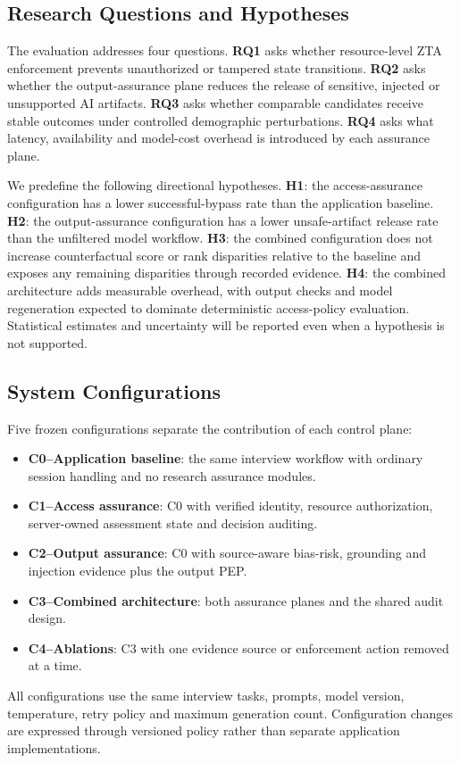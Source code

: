 \documentclass[conference]{IEEEtran}
\begin{document}
\subsection{Research Questions and Hypotheses}

The evaluation addresses four questions. \textbf{RQ1} asks whether resource-level ZTA enforcement prevents unauthorized or tampered state transitions. \textbf{RQ2} asks whether the output-assurance plane reduces the release of sensitive, injected or unsupported AI artifacts. \textbf{RQ3} asks whether comparable candidates receive stable outcomes under controlled demographic perturbations. \textbf{RQ4} asks what latency, availability and model-cost overhead is introduced by each assurance plane.

We predefine the following directional hypotheses. \textbf{H1}: the access-assurance configuration has a lower successful-bypass rate than the application baseline. \textbf{H2}: the output-assurance configuration has a lower unsafe-artifact release rate than the unfiltered model workflow. \textbf{H3}: the combined configuration does not increase counterfactual score or rank disparities relative to the baseline and exposes any remaining disparities through recorded evidence. \textbf{H4}: the combined architecture adds measurable overhead, with output checks and model regeneration expected to dominate deterministic access-policy evaluation. Statistical estimates and uncertainty will be reported even when a hypothesis is not supported.

\subsection{System Configurations}

Five frozen configurations separate the contribution of each control plane:
\begin{itemize}
\item \textbf{C0--Application baseline}: the same interview workflow with ordinary session handling and no research assurance modules.
\item \textbf{C1--Access assurance}: C0 with verified identity, resource authorization, server-owned assessment state and decision auditing.
\item \textbf{C2--Output assurance}: C0 with source-aware bias-risk, grounding and injection evidence plus the output PEP.
\item \textbf{C3--Combined architecture}: both assurance planes and the shared audit design.
\item \textbf{C4--Ablations}: C3 with one evidence source or enforcement action removed at a time.
\end{itemize}
All configurations use the same interview tasks, prompts, model version, temperature, retry policy and maximum generation count. Configuration changes are expressed through versioned policy rather than separate application implementations.
\end{document}
